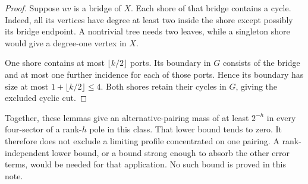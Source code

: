 \begin{proof}
Suppose $uv$ is a bridge of $X$.
Each shore of that bridge contains a cycle.
Indeed, all its vertices have degree at least two inside the shore except possibly its bridge endpoint.
A nontrivial tree needs two leaves, while a singleton shore would give a degree-one vertex in $X$.

One shore contains at most $\lfloor k/2\rfloor$ ports.
Its boundary in $G$ consists of the bridge and at most one further incidence for each of those ports.
Hence its boundary has size at most $1+\lfloor k/2\rfloor\le4$.
Both shores retain their cycles in $G$, giving the excluded cyclic cut.
\end{proof}

Together, these lemmas give an alternative-pairing mass of at least $2^{-h}$ in every four-sector of a rank-$h$ pole in this class.
That lower bound tends to zero.
It therefore does not exclude a limiting profile concentrated on one pairing.
A rank-independent lower bound, or a bound strong enough to absorb the other error terms, would be needed for that application.
No such bound is proved in this note.
